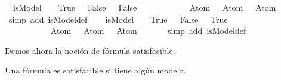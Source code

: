 \begin{isabellebody}
\ {\isachardoublequoteopen}{\isasymnot}\ isModel\ {\isacharparenleft}{\isasymA}\ {\isacharparenleft}{}\ {\isacharcolon}{\isacharequal}\ True{\isacharcomma}\ {}\ {\isacharcolon}{\isacharequal}\ False{\isacharcomma}\ {}\ {\isacharcolon}{\isacharequal}\ False{\isacharparenright}{\isacharparenright}\ \isanewline
\ \ \ \ \ \ \ \ \ \ {\isacharparenleft}\isactrlbold {\isasymnot}\ {\isacharparenleft}{\isacharparenleft}Atom\ {}\ \isactrlbold {\isasymand}\ Atom\ {}{\isacharparenright}{\isacharparenright}\ \isactrlbold {\isasymrightarrow}\ Atom\ {}{\isacharparenright}{\isachardoublequoteclose}\isanewline
\ \ \ \ \isamarkupfalse%
\ {\isacharparenleft}simp\ add{\isacharcolon}\ isModel{\isacharunderscore}def{\isacharparenright}\isanewline
\isanewline
\ \ \isamarkupfalse%
\ {\isachardoublequoteopen}isModel\ {\isacharparenleft}{\isasymA}\ {\isacharparenleft}{}\ {\isacharcolon}{\isacharequal}\ True{\isacharcomma}\ {}\ {\isacharcolon}{\isacharequal}\ False{\isacharcomma}\ {}\ {\isacharcolon}{\isacharequal}\ True{\isacharparenright}{\isacharparenright}\ \isanewline
\ \ \ \ \ \ \ \ \ \ {\isacharparenleft}\isactrlbold {\isasymnot}\ {\isacharparenleft}{\isacharparenleft}Atom\ {}\ \isactrlbold {\isasymor}\ Atom\ {}{\isacharparenright}{\isacharparenright}\ \isactrlbold {\isasymrightarrow}\ Atom\ {}{\isacharparenright}{\isachardoublequoteclose}\isanewline
\ \ \ \ \isamarkupfalse%
\ {\isacharparenleft}simp\ add{\isacharcolon}\ isModel{\isacharunderscore}def{\isacharparenright}%
\endisatagproof
{\isafoldproof}%
%
\isadelimproof
\isanewline
%
\endisadelimproof
\isanewline
{}\isamarkupfalse%
%
\begin{isamarkuptext}%
Demos ahora la noción de fórmula satisfacible.

  \begin{definicion}
    Una fórmula es satisfacible si tiene algún modelo.
  \end{definicion}


\end{isamarkuptext}
\end{isabellebody}
